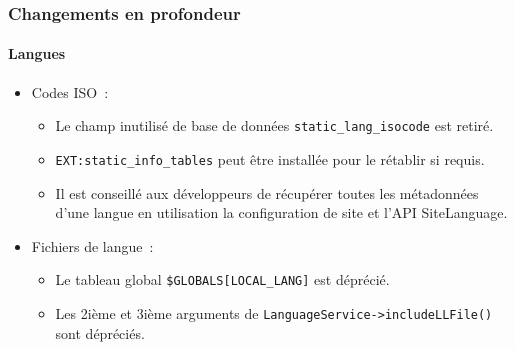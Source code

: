 \begin{frame}[fragile]
	\frametitle{Changements en profondeur}
	\framesubtitle{Langues}

	\begin{itemize}
		\item Codes ISO~:

			\begin{itemize}
				\item Le champ inutilisé de base de données \texttt{static\_lang\_isocode} est retiré.
				\item \texttt{EXT:static\_info\_tables} peut être installée pour le rétablir si requis.
				\item Il est conseillé aux développeurs de récupérer toutes les métadonnées d'une langue
					en utilisation la configuration de site et l'API SiteLanguage.
			\end{itemize}

		\item Fichiers de langue~:

			\begin{itemize}
				\item Le tableau global \texttt{\$GLOBALS[LOCAL\_LANG]} est déprécié.
				\item Les 2ième et 3ième arguments de \texttt{LanguageService->includeLLFile()} sont dépréciés.
			\end{itemize}

	\end{itemize}

\end{frame}


